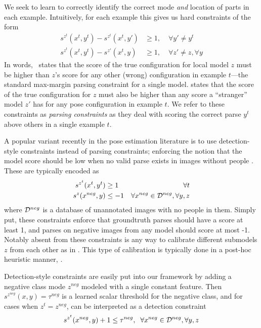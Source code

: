   We seek to learn to correctly identify the 
correct mode {\em and } location of parts in each example.  Intuitively, for 
each example this gives us hard constraints of the form \begin{align}
s^{z^t}(x^t,y^t) - s^{z^t}(x^t,y') &\geq 1,\; &\forall y' \neq y^t 
\label{eq:c1} \\
s^{z^t}(x^t,y^t) - s^{z'}(x^t,y) &\geq 1 ,\; &\forall z' \neq z, \forall y 
\label{eq:c2}
\end{align}
In words,~ states that the score of the true configuration for local 
model $z$ must be higher than $z$'s score for any other (wrong) configuration 
in example $t$---the standard max-margin parsing constraint for a single model.  
 states that the score of the true configuration for $z$ must also 
be higher than any score a ``stranger'' model $z'$ has for any pose 
configuration in example $t$.  We refer to these constraints as {\em parsing
constraints} as they deal with scoring the correct parse $y^t$ above others in 
a single example $t$.

 A popular variant recently in the pose 
estimation literature is to use detection-style constraints instead of parsing 
constraints; enforcing the notion that the model score should be low when no 
valid parse exists in images without people 
\citep{deva2011,batra2012,tianexploring}.  These are typically encoded as
\begin{align}
s^{z^t}(x^t, y^t) &\geq 1 &\forall t \\
s^{z}(x^{neg}, y) &\leq -1 &\forall x^{neg} \in \mathcal{D}^{neg}, \forall y,z
\end{align}
where $\mathcal{D}^{neg}$ is a database of unannotated images with no people in them.  
Simply put, these constraints enforce that groundtruth parses should have a 
score at least 1, and parses on negative images from any model should score at 
most -1.  Notably absent from these constraints is any way to calibrate 
different submodels $z$ from each other as in .  This type of 
calibration is typically done in a post-hoc heuristic manner, \eg 
\citep{everingham2011,esvm}.  

Detection-style constraints are easily put into our framework by adding a 
negative class mode $z^{neg}$ modeled with a single constant feature.  Then 
$s^{z^{neg}}(x,y) = \tau^{neg}$ is a learned scalar threshold for the negative 
class, and for cases when $z^t = z^{neg}$,  can be interpreted as a 
detection constraint
\begin{align}
s^{z^t}(x^{neg},y) + 1 \leq \tau^{neg},\;\; \forall x^{neg} \in \mathcal{D}^{neg}, 
\forall y,z\label{eq:cneg}
\end{align}

